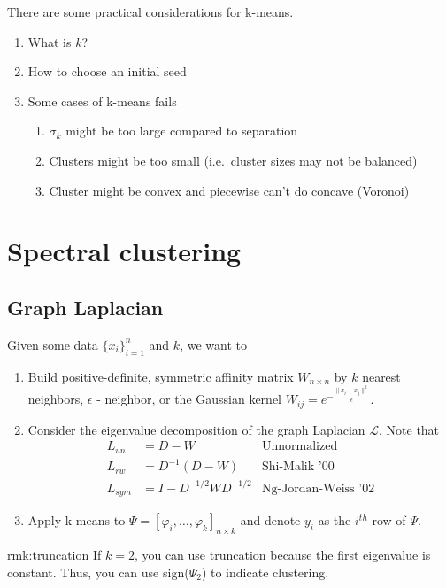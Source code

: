 \documentclass[12pt]{article}
\theoremstyle{plain}
\begin{document}
There are some practical considerations for k-means.
\begin{enumerate}
  \item What is $ k $?
  \item How to choose an initial seed
  \item Some cases of k-means fails
  \begin{enumerate}
    \item $ \sigma_k $ might be too large compared to separation
    \item Clusters might be too small (i.e.\ cluster sizes may not be balanced)
    \item Cluster might be convex and piecewise can't do concave (Voronoi)
  \end{enumerate}
\end{enumerate}

\section{Spectral clustering}
\label{sec:spectral}

\subsection{Graph Laplacian}

Given some data $ \{ x_i \}_{i = 1}^n $ and $ k $, we want to
\begin{enumerate}
  \item Build positive-definite, symmetric affinity matrix $ W_{n \times n} $ by $ k $ nearest neighbors, $ \epsilon $ - neighbor, or the Gaussian kernel $ W_{ij} = e^{- \frac{\| x_i - x_j \|^2}{\epsilon}} $.
  \item Consider the eigenvalue decomposition of the graph Laplacian $ \mathcal{L} $.
  Note that
  \begin{align*}
    L_{un} &= D - W  & \text{Unnormalized} \\
    L_{rw} &= D^{-1} (D - W) & \text{Shi-Malik '00} \\
    L_{sym} &= I - D^{-1/2} W D^{-1/2} & \text{Ng-Jordan-Weiss '02}
  \end{align*}
  \item Apply k means to $ \Psi = [\varphi_i, \ldots, \varphi_k]_{n \times k} $ and denote $ y_i $ as the $ i^{th} $ row of $ \Psi $.
\end{enumerate}

\begin{rmk}[Truncation]{rmk:truncation}
  If $ k = 2$, you can use truncation because the first eigenvalue is constant. Thus, you can use sign($\Psi_2$) to indicate clustering.
\end{rmk}
\end{document}
